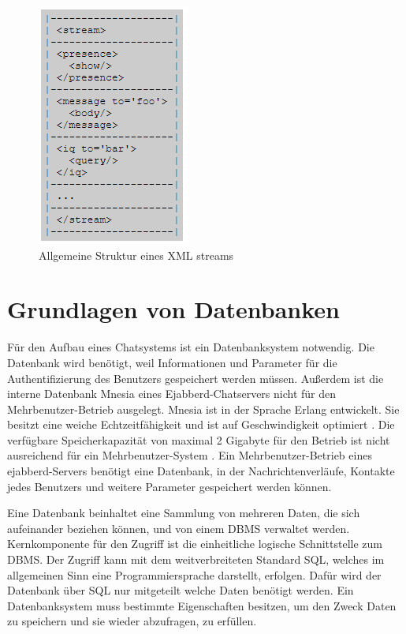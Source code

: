 \documentclass[a4paper,titlepage,halfparskip,12pt]{scrreprt}
\begin{document}
\begin{onehalfspacing}
\begin{figure}[h]
	\includegraphics[scale=1.2]{images/XML_Stream}
	\caption{Allgemeine Struktur eines XML streams}
	\label{img:StrukturXMLstream}
\end{figure}
\newpage


\section{Grundlagen von Datenbanken}
\label{sec:Datenbank}
Für den Aufbau eines Chatsystems ist ein Datenbanksystem notwendig. Die Datenbank wird benötigt, weil Informationen und Parameter für die Authentifizierung des Benutzers gespeichert werden müssen. Außerdem ist die interne Datenbank Mnesia eines Ejabberd-Chatservers nicht für den Mehrbenutzer-Betrieb ausgelegt. Mnesia ist in der Sprache Erlang entwickelt. Sie besitzt eine weiche Echtzeitfähigkeit und ist auf Geschwindigkeit optimiert \cite{MnesiaDoc}. Die verfügbare Speicherkapazität von maximal 2 Gigabyte für den Betrieb ist nicht ausreichend für ein Mehrbenutzer-System \cite{ejabberdDoc}. Ein Mehrbenutzer-Betrieb eines ejabberd-Servers benötigt eine Datenbank, in der Nachrichtenverläufe, Kontakte jedes Benutzers und weitere Parameter gespeichert werden können.

Eine Datenbank beinhaltet eine Sammlung von mehreren Daten, die sich aufeinander beziehen können, und von einem \ac{DBMS} verwaltet werden. Kernkomponente für den Zugriff ist die einheitliche logische Schnittstelle zum \ac{DBMS}. Der Zugriff kann mit dem weitverbreiteten Standard \ac{SQL}, welches im allgemeinen Sinn eine Programmiersprache darstellt, erfolgen. Dafür wird der Datenbank über \ac{SQL} nur mitgeteilt welche Daten benötigt werden. Ein Datenbanksystem muss bestimmte Eigenschaften besitzen, um den Zweck Daten zu speichern und sie wieder abzufragen, zu erfüllen.


\end{onehalfspacing}
\end{document}
